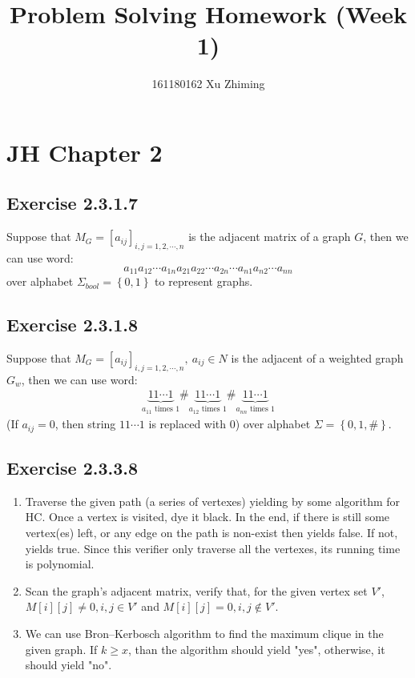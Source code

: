 \documentclass[twocolumn]{article}
\begin{document}
	\title{Problem Solving Homework (Week 1)}\author{161180162 Xu Zhiming}\maketitle
	\section*{JH Chapter 2}
	\subsection*{Exercise 2.3.1.7}
	Suppose that $M_G=[a_{ij}]_{i,j=1,2,\cdots,n}$ is the adjacent matrix of a graph $G$, then we can use word:
	\[
	a_{11}a_{12}\cdots a_{1n}a_{21}a_{22}\cdots a_{2n}\cdots a_{n1}a_{n2}\cdots a_{nn}
	\]
	over alphabet $\Sigma_{bool}=\left\{0,1\right\}$ to represent graphs.
	\subsection*{Exercise 2.3.1.8}
	Suppose that $M_G=[a_{ij}]_{i,j=1,2,\cdots,n},\ a_{ij}\in N$ is the adjacent of a weighted graph $G_w$, then we can use word:
	\[
	\begin{aligned}
		\underbrace{11\cdots1}_{a_{11}\text{ times 1}}\text{\#}\underbrace{11\cdots1}_{a_{12}\text{ times 1}}\text{\#}\underbrace{11\cdots1}_{a_{nn}\text{ times 1}}
	\end{aligned}
	\]
	(If $a_{ij}=0$, then string $11\cdots1$ is replaced with 0)
	over alphabet $\Sigma=\left\{0,1,\text{\#}\right\}$.
	\subsection*{Exercise 2.3.3.8}
	\begin{enumerate}
		\item Traverse the given path (a series of vertexes) yielding by some algorithm for HC. Once a vertex is visited, dye it black. In the end, if there is still some vertex(es) left, or any edge on the path is non-exist then yields false. If not, yields true. Since this verifier only traverse all the vertexes, its running time is polynomial.
		\item Scan the graph's adjacent matrix, verify that, for the given vertex set $V'$, $M[i][j]\ne 0,i,j\in V'$ and $M[i][j]=0,i,j\notin V'$.
		\item We can use Bron–Kerbosch algorithm to find the maximum clique in the given graph. If $k\ge x$, than the algorithm should yield "yes", otherwise, it should yield "no".
	\end{enumerate}
	\newpage
\end{document}
